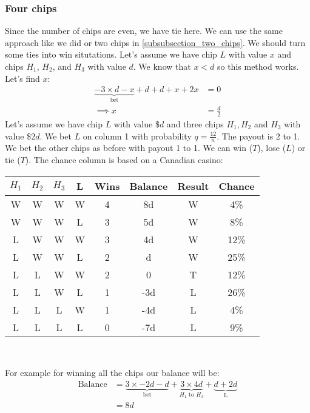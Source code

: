 \documentclass{book}
\begin{document}
	\subsubsection{Four chips}
	Since the number of chips are even, we have tie here. We can use the same approach like we did or two chips in \ref{subsubsection_two_chips}. We should turn some ties into win situtations. Let's assume we have chip $L$ with value $x$ and chips $H_1$, $H_2$, and $H_3$ with value $d$. We know that $x < d$ so this method works. Let's find $x$:
	\begin{equation*}
		\begin{split}
			\underbrace{-3 \times d - x}_\text{bet} + d + d +x + 2x &= 0 \\
			\implies x &= \frac{d}{2}
		\end{split}
	\end{equation*}
	Let's assume we have chip $L$ with value \$$d$ and three chips $H_1, H_2$ and $H_3$ with value \$$2d$. We bet $L$ on column 1 with probability $q = \frac{12}{n}$. The payout is 2 to 1. We bet the other chips as before with payout 1 to 1. We can win ($T$), lose ($L$) or tie ($T$). The chance column is based on a Canadian casino: \\
	\par
	\begin{tabular}[h!]{c c c c c c c c}
		\toprule
		$H_1$ & $H_2$ & $H_3$ & L & Wins & Balance & Result & Chance \\
		\midrule
		W & W & W & W & 4 & 8d & W & 4\% \\
		W & W & W & L & 3 & 5d & W & 8\% \\
		L & W & W & W & 3 & 4d & W & 12\% \\
		L & W & W & L & 2 & d & W & 25\% \\
		L & L & W & W & 2 & 0 & T & 12\% \\
		L & L & W & L & 1 & -3d & L & 26\% \\
		L & L & L & W & 1 & -4d & L & 4\% \\
		L & L & L & L & 0 & -7d & L & 9\% \\
		\bottomrule
	\end{tabular} \\	
	\par
	For example for winning all the chips our balance will be:
	\begin{equation*}
		\begin{split}
			\text{Balance} &= \underbrace{3 \times -2d - d}_\text{bet} + \underbrace{3 \times 4d}_\text{$H_1$ to $H_3$} + \underbrace{d + 2d}_\text{L} \\
			&= 8d
		\end{split}
	\end{equation*}
\end{document}
